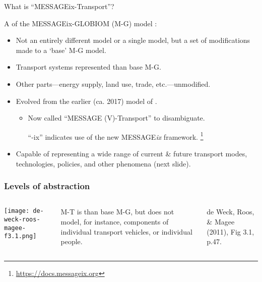 \documentclass[12pt,aspectratio=169]{beamer}
\begin{document}
\begin{frame}{What is “MESSAGEix-Transport”?}

A  of the MESSAGEix-GLOBIOM (M-G) model :
\begin{itemize}
  \item Not an entirely different model or a single model, but a set of modifications made to a ‘base’ M-G model.
  \item Transport systems represented  than base M-G.
  \item Other parts—energy supply, land use, trade, etc.—unmodified.
  \item Evolved from the earlier (ca. 2017) model of \textcite{mccollum-2017}.
  \begin{itemize}
    \item Now called “MESSAGE (V)-Transport” to disambiguate.

    “-ix” indicates use of the new MESSAGE\emph{ix} framework.%
    \footnote{\url{https://docs.messageix.org}}
  \end{itemize}
  \item Capable of representing a wide range of current \& future transport modes, technologies, policies, and other phenomena (next slide).
\end{itemize}
\end{frame}

\begin{frame}
\frametitle{Levels of abstraction}
\begin{columns}[b]
\texttt{[image: de-weck-roos-magee-f3.1.png]}

M-T is  than base M-G, but does not model, for instance, components of individual transport vehicles, or individual people.

\bigskip
de Weck, Roos, \& Magee (2011), Fig 3.1, p.47.
\end{columns}
\end{frame}
\end{document}
